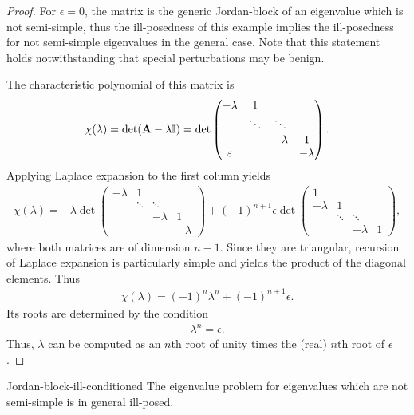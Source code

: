 \begin{proof}
  For $\epsilon=0$, the matrix is the generic Jordan-block of an eigenvalue which is not semi-simple, thus the ill-posedness of this example implies the ill-posedness for not semi-simple eigenvalues in the general case. Note that this statement holds notwithstanding that special perturbations may be benign.
  
  The characteristic polynomial of this matrix is
  \begin{gather}
      \chi(\lambda) = \det(\mathbf A-\lambda\mathbb I)
      = \det\begin{pmatrix}
      -\lambda&1\\  
        &\ddots&\ddots\\
        &&-\lambda&1\\
        \varepsilon &&&-\lambda
      \end{pmatrix}.
  \end{gather}
  Applying Laplace expansion to the first column yields
  \begin{gather}
      \chi(\lambda)
      = -\lambda \det\begin{pmatrix}
        -\lambda&1\\
        &\ddots&\ddots\\
        &&-\lambda&1\\
        &&&-\lambda
      \end{pmatrix}
      + (-1)^{n+1} \epsilon\det\begin{pmatrix}
        1 \\
        -\lambda &1\\
        &\ddots&\ddots\\
        &&-\lambda&1
      \end{pmatrix},
  \end{gather}
  where both matrices are of dimension $n-1$. Since they are triangular, recursion of Laplace expansion is particularly simple and yields the product of the diagonal elements. Thus
  \begin{gather}
      \chi(\lambda) = (-1)^n \lambda^n
      + (-1)^{n+1} \epsilon.
  \end{gather}
  Its roots are determined by the condition
  \begin{gather}
      \lambda^n = \epsilon.
  \end{gather}
  Thus, $\lambda$ can be computed as an $n$th root of unity times the (real) $n$th root of $\epsilon$.
\end{proof}

\begin{Theorem}{Jordan-block-ill-conditioned}
  The eigenvalue problem for eigenvalues which are not semi-simple is
  in general ill-posed.
\end{Theorem}

